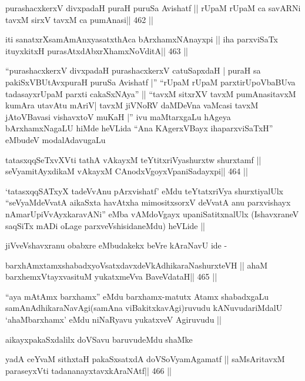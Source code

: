 \begin{shl}
purashacxkerxV divxpadaH puraH puruSa Avishatf ||
rUpaM rUpaM ca savARNi tavxM sirxV tavxM ca pumAnasi\hfill || 462 ||
\end{shl}

\begin{shl}
iti sanatxrXsamAmAnxyasatxthAca bArxhamxNAnayxpi ||
iha parxviSaTx ituyxkitxH purasAtxdAbxrXhamxNoVditA\hfill || 463 ||
\end{shl}

\begin{artha}
``purashacxkerxV divxpadaH purashacxkerxV catuSapxdaH | puraH sa
  pakiSxVBUtAvxpuraH puruSa Avishatf |'' ``rUpaM rUpaM
  parxtirUpoVbaBUva tadasayxrUpaM parxti cakaSxNAya'' ||  ``tavxM
  sitxrXV tavxM pumAnasitavxM kumAra utavAtu mAriV| tavxM jiVNoRV
  daMDeVna vaMcasi tavxM jAtoVBavasi vishavxtoV muKaH |'' ivu
  maMtarxgaLu hAgeya bArxhamxNagaLU hiMde heVLida ``Ana KAgerxVBayx
  ihaparxviSaTxH'' eMbudeV modalAdavugaLu 
\end{artha}

\begin{shl}
tatasxqqSeTxvXVti tathA vAkayxM teYtitxriVyashurxtw shurxtamf ||
seVyamitAyxdikaM vAkayxM CAnodxVgoyxVpaniSadayxpi\hfill || 464 ||
\end{shl}

\begin{artha}
`tatasxqqSATxyX tadeVvAnu pArxvishatf' eMdu teYtatxriVya shurxtiyalUlx
  ``seVyaMdeVvatA aikaSxta havAtxha mimositxsorxV deVvatA anu
  parxvishayx nAmarUpiVvAyxkaravANi'' eMba vAMdoVgayx
  upaniSatitxnalUlx (IshavxraneV saqSiTx mADi oLage
  parxveVshisidaneMdu) heVLide || 

jiVveVshavxranu obabxre eMbudakekx beVre kAraNavU ide -
\end{artha}

\begin{shl}
barxhAmxtamxshabadxyoVsatxdavxdeVkAdhikaraNashurxteVH ||
ahaM barxhemxVtayxvasituM yukatxmeVva BaveVdataH\hfill || 465 ||
\end{shl}

\begin{artha}
``aya mAtAmx barxhamx'' eMdu barxhamx-matutx Atamx shabadxgaLu
  samAnAdhikaraNavAgi(samAna viBakitxkavAgi)ruvudu kANuvudariMdalU
  `ahaMbarxhamx' eMdu niNaRyavu yukatxveV Agiruvudu ||

aikayxpakaSxdalilx doVSavu baruvudeMdu shaMke
\end{artha}

\begin{shl}
yadA ceYvaM sithxtaH pakaSxsatxdA doVSoV\s yamAgamatf ||
saMsAritavxM paraseyxVti tadananayxtavxkAraNAtf\hfill || 466 ||
\end{shl}


